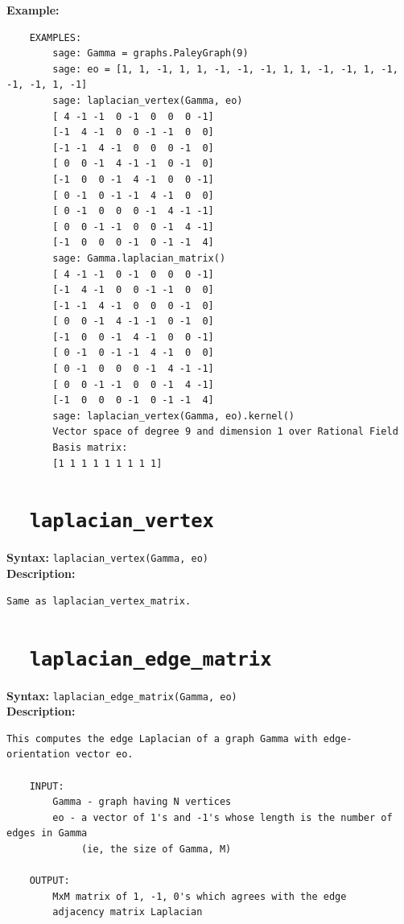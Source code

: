 \documentclass{article}
\begin{document}
\textbf{Example:}
\begin{verbatim}
    EXAMPLES:
        sage: Gamma = graphs.PaleyGraph(9)
        sage: eo = [1, 1, -1, 1, 1, -1, -1, -1, 1, 1, -1, -1, 1, -1, -1, -1, 1, -1]
        sage: laplacian_vertex(Gamma, eo)
        [ 4 -1 -1  0 -1  0  0  0 -1]
        [-1  4 -1  0  0 -1 -1  0  0]
        [-1 -1  4 -1  0  0  0 -1  0]
        [ 0  0 -1  4 -1 -1  0 -1  0]
        [-1  0  0 -1  4 -1  0  0 -1]
        [ 0 -1  0 -1 -1  4 -1  0  0]
        [ 0 -1  0  0  0 -1  4 -1 -1]
        [ 0  0 -1 -1  0  0 -1  4 -1]
        [-1  0  0  0 -1  0 -1 -1  4]
        sage: Gamma.laplacian_matrix()
        [ 4 -1 -1  0 -1  0  0  0 -1]
        [-1  4 -1  0  0 -1 -1  0  0]
        [-1 -1  4 -1  0  0  0 -1  0]
        [ 0  0 -1  4 -1 -1  0 -1  0]
        [-1  0  0 -1  4 -1  0  0 -1]
        [ 0 -1  0 -1 -1  4 -1  0  0]
        [ 0 -1  0  0  0 -1  4 -1 -1]
        [ 0  0 -1 -1  0  0 -1  4 -1]
        [-1  0  0  0 -1  0 -1 -1  4]
        sage: laplacian_vertex(Gamma, eo).kernel()
        Vector space of degree 9 and dimension 1 over Rational Field
        Basis matrix:
        [1 1 1 1 1 1 1 1 1]
\end{verbatim}


\section{\tt \ \ laplacian\_vertex}
  
\textbf{Syntax:} \verb}laplacian_vertex(Gamma, eo)}\\

\textbf{Description:}
\begin{verbatim}
Same as laplacian_vertex_matrix.
\end{verbatim}


\section{\tt \ \ laplacian\_edge\_matrix}

\textbf{Syntax:} \verb}laplacian_edge_matrix(Gamma, eo)}\\

\textbf{Description:}
\begin{verbatim}
This computes the edge Laplacian of a graph Gamma with edge-orientation vector eo. 

    INPUT:
        Gamma - graph having N vertices
        eo - a vector of 1's and -1's whose length is the number of edges in Gamma
             (ie, the size of Gamma, M)

    OUTPUT:
        MxM matrix of 1, -1, 0's which agrees with the edge
        adjacency matrix Laplacian 
\end{verbatim}
\end{document}
